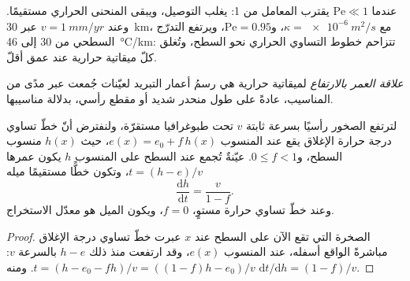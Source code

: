 عندما $\mathrm{Pe} \ll 1$ يقترب المعامل من 1: يغلب التوصيل، ويبقى
المنحنى الحراري مستقيمًا. وعند $v = \qty{1}{mm/yr}$ عبر \qty{30}{km}، مع
$\kappa = \qty{e-6}{m^2/s}$، و$\mathrm{Pe} = 0.95$، ويرتفع التدرّج السطحي
من 30 إلى \qty{46}{\celsius/km}: تتزاحم خطوط التساوي الحراري نحو
السطح، وتُغلق كلّ ميقاتية حرارية عند عمق أقلّ.

\begin{definition}\label{def:b3:orogenic-wedges:age-elevation}
\emph{علاقة العمر بالارتفاع} لميقاتية حرارية هي
رسمُ أعمار التبريد لعيّنات جُمعت عبر مدًى من المناسيب،
عادةً على طول منحدر شديد أو مقطع رأسي،
بدلالة مناسيبها.
\end{definition}

\begin{proposition}\label{prop:b3:orogenic-wedges:age-elevation}
لترتفع الصخور رأسيًا بسرعة ثابتة $v$ تحت طبوغرافيا مستقرّة،
ولنفترض أنّ خطّ تساوي درجة حرارة الإغلاق يقع عند المنسوب $e(x) = e_0 +
f\,h(x)$، حيث $h(x)$ منسوب السطح، و$0 \le f < 1$. عيّنةٌ
تُجمع عند السطح على المنسوب $h$ يكون عمرها $t = (h - e)/v$،
وتكون  خطًّا مستقيمًا ميله
\[
  \frac{\mathrm dh}{\mathrm dt} = \frac{v}{1 - f}.
\]
وعند خطّ تساوي حرارة مستوٍ، $f = 0$، ويكون الميل هو معدّل الاستخراج.
\end{proposition}

\begin{proof}
الصخرة التي تقع الآن على السطح عند $x$ عبرت خطّ تساوي درجة الإغلاق مباشرةً
الواقع أسفله، عند المنسوب $e(x)$، وقد ارتفعت منذ ذلك $h - e$ بالسرعة $v$:
$t = (h - e_0 - fh)/v = ((1 - f)h - e_0)/v$. ومنه $\mathrm dt/\mathrm dh =
(1 - f)/v$.
\end{proof}

